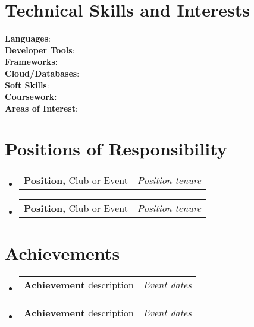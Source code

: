 \documentclass[a4paper,11pt]{article}
\makeatletter
\newcommand{\resumePOR}[3]{
\vspace{0.5mm}\item
    \begin{tabular*}{0.97\textwidth}[t]{l@{\extracolsep{\fill}}r}
        \textbf{#1}\hspace{0.3mm}#2 & \textit{\small{#3}} 
    \end{tabular*}
    \vspace{-2mm}
}
\newcommand{\resumeSubHeadingListStart}{\begin{itemize}[leftmargin=*,labelsep=0mm]}
\newcommand{\resumeSubHeadingListEnd}{\end{itemize}\vspace{2mm}}
\makeatother
\begin{document}
\section{\textbf{Technical Skills and Interests}}
 \begin{itemize}[leftmargin=0.05in, label={}]
    \small{\item{
     \textbf{Languages}{: } \\
     \textbf{Developer Tools}{: } \\
     \textbf{Frameworks}{: } \\
     \textbf{Cloud/Databases}{: } \\
     \textbf{Soft Skills}{: } \\
     \textbf{Coursework}{: } \\
     \textbf{Areas of Interest}{: } \\
    }}
 \end{itemize}
 \vspace{-16pt}



\section{\textbf{Positions of Responsibility}}
\vspace{-0.4mm}
\resumeSubHeadingListStart
\resumePOR{Position, } %
    {Club or Event} %
    {Position tenure} %
\resumePOR{Position, } %
    {Club or Event} %
    {Position tenure} %
\resumeSubHeadingListEnd
\vspace{-5mm}




\section{\textbf{Achievements}}
\vspace{-0.4mm}
\resumeSubHeadingListStart
\resumePOR{Achievement } %
    {description} %
    {Event dates} %
    
\resumePOR{Achievement } %
    {description} %
    {Event dates} %
\resumeSubHeadingListEnd
\vspace{-5mm}



\end{document}
